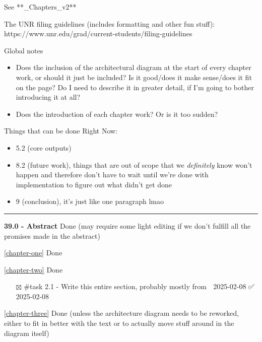 See **\_Chapters\_v2**

The UNR filing guidelines (includes formatting and other fun stuff):
https://www.unr.edu/grad/current-students/filing-guidelines

Global notes

\begin{itemize}
\tightlist
\item
  Does the inclusion of the architectural diagram at the start of every
  chapter work, or should it just be included? Is it good/does it make
  sense/does it fit on the page? Do I need to describe it in greater
  detail, if I'm going to bother introducing it at all?
\item
  Does the introduction of each chapter work? Or is it too sudden?
\end{itemize}

Things that can be done Right Now:

\begin{itemize}
\tightlist
\item
  5.2 (core outputs)
\item
  8.2 (future work), things that are out of scope that we
  \emph{definitely} know won't happen and therefore don't have to wait
  until we're done with implementation to figure out what didn't get
  done
\item
  9 (conclusion), it's just like one paragraph lmao
\end{itemize}

\begin{center}\rule{0.5\linewidth}{0.5pt}\end{center}

\textbf{39.0 - Abstract} Done (may require some light editing if we
don't fulfill all the promises made in the abstract)

\autoref{chapter-one} Done

\autoref{chapter-two} Done

\begin{itemize}
\tightlist
\item[$\boxtimes$]
  \#task 2.1 - Write this entire section, probably mostly from
  \cite{grajedaAvailabilityDatasetsDigital2017} 📅 2025-02-08 ✅
  2025-02-08
\end{itemize}

\autoref{chapter-three} Done (unless the architecture
diagram needs to be reworked, either to fit in better with the text or
to actually move stuff around in the diagram itself)

